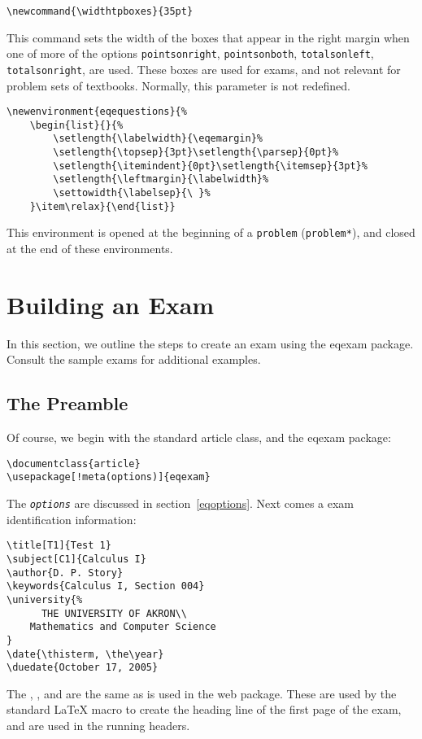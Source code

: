 \documentclass{article}
\def\meta#1{\textit{\texttt{#1}}}
\begin{document}
\begin{Verbatim}[xleftmargin=\leftmargini,fontsize=\fontsize{9}{11}\selectfont]
\newcommand{\widthtpboxes}{35pt}
\end{Verbatim}
This command sets the width of the boxes that appear in the right margin
when one of more of the options \texttt{pointsonright},
\texttt{pointsonboth}, \texttt{totalsonleft}, \texttt{totalsonright}, are
used. These boxes are used for exams, and not relevant for problem sets of
textbooks. Normally, this parameter is not redefined.

\begin{Verbatim}[xleftmargin=\leftmargini,fontsize=\fontsize{9}{11}\selectfont]
\newenvironment{eqequestions}{%
    \begin{list}{}{%
        \setlength{\labelwidth}{\eqemargin}%
        \setlength{\topsep}{3pt}\setlength{\parsep}{0pt}%
        \setlength{\itemindent}{0pt}\setlength{\itemsep}{3pt}%
        \setlength{\leftmargin}{\labelwidth}%
        \settowidth{\labelsep}{\ }%
    }\item\relax}{\end{list}}
\end{Verbatim}
This environment is opened at the beginning of a \texttt{problem}
(\texttt{problem*}), and closed at the end of these environments.

\section{Building an Exam}

In this section, we outline the steps to create an exam using the
\textsf{eqexam} package. Consult the sample exams for additional
examples.

\subsection{The Preamble}\label{preamble}

Of course, we begin with the standard article class, and the
\textsf{eqexam} package:
\begin{Verbatim}[xleftmargin=\leftmargini,commandchars=!()]
\documentclass{article}
\usepackage[!meta(options)]{eqexam}
\end{Verbatim}
\noindent The \meta{options} are discussed in
section~\ref{eqoptions}.  Next comes a exam identification
information:
\begin{Verbatim}[xleftmargin=\leftmargini,fontsize=\fontsize{9}{11}\selectfont]
\title[T1]{Test 1}
\subject[C1]{Calculus I}
\author{D. P. Story}
\keywords{Calculus I, Section 004}
\university{%
      THE UNIVERSITY OF AKRON\\
    Mathematics and Computer Science
}
\date{\thisterm, \the\year}
\duedate{October 17, 2005}
\end{Verbatim}
\noindent The , ,  and 
are the same as is used in the \textsf{web} package. These are
used by the standard {\LaTeX} macro to create the heading line of
the first page of the exam, and are used in the running headers.
\end{document}
